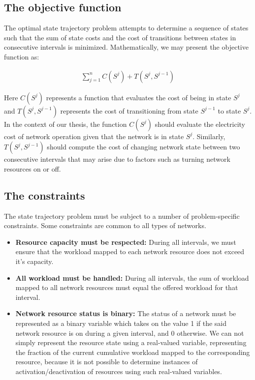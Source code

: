 \subsection{The objective function}
\label{subsec:framework:objective} %
The optimal state trajectory problem attempts to determine a sequence of states such that the sum of state costs and the cost of transitions between states in consecutive intervals is minimized. Mathematically, we may present the objective function as:

\begin{align}
\sum_{j=1}^n C(S^j) + T(S^j, S^{j-1})
\end{align}

Here $C(S^j)$ represents a function that evaluates the cost of being in state $S^j$ and $T(S^j,S^{j-1})$ represents the cost of transitioning from state $S^{j-1}$ to state $S^j$. In the context of our thesis, the function $C(S^j)$ should evaluate the electricity cost of network operation given that the network is in state $S^j$. Similarly, $T(S^j,S^{j-1})$ should compute the cost of changing network state between two consecutive intervals that may arise due to factors such as turning network resources on or off.

\subsection{The constraints}
\label{subsec:framework:constraints} %
The state trajectory problem must be subject to a number of problem-specific constraints. Some constraints are common to all types of networks. 

\begin{itemize}
\item \textbf{Resource capacity must be respected:} During all intervals, we must ensure that the workload mapped to each network resource does not exceed it's capacity.
\item \textbf{All workload must be handled:} During all intervals, the sum of workload mapped to all network resources must equal the offered workload for that interval.
\item \textbf{Network resource status is binary:} The status of a network must be represented as a binary variable which takes on the value 1 if the said network resource is on during a given interval, and 0 otherwise. We can not simply represent the resource state using a real-valued variable, representing the fraction of the current cumulative workload mapped to the corresponding resource, because it is not possible to determine instances of activation/deactivation of resources using such real-valued variables.
\end{itemize}

